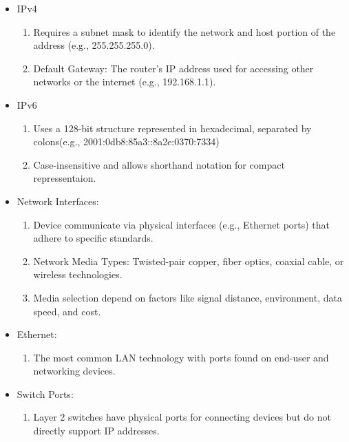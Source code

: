 \documentclass[a4paper,11pt]{article}
\begin{document}
\begin{itemize}
    \item IPv4
    \begin{enumerate}
        \item Requires a subnet mask to identify the network and host portion of the address (e.g., 255.255.255.0).\\
        \item Default Gateway: The router's IP address used for accessing other networks or the internet (e.g., 192.168.1.1).\\
    \end{enumerate}
    \item IPv6
    \begin{enumerate}
        \item Uses a 128-bit structure represented in hexadecimal, separated by colons(e.g., 2001:0db8:85a3::8a2e:0370:7334)\\
        \item Case-insensitive and allows shorthand notation for compact repressentaion.\\
    \end{enumerate}
    \item Network Interfaces:
    \begin{enumerate}
        \item Device communicate via physical interfaces (e.g., Ethernet ports) that adhere to specific standards.\\
        \item Network Media Types: Twisted-pair copper, fiber optics, coaxial cable, or wireless technologies.\\
        \item Media selection depend on factors like signal distance, environment, data speed, and cost.\\
    \end{enumerate}
    \item Ethernet:
    \begin{enumerate}
        \item The most common LAN technology with ports found on end-user and networking devices.\\
    \end{enumerate}
    \item Switch Ports:
    \begin{enumerate}
        \item Layer 2 switches have physical ports for connecting devices but do not directly support IP addresses.\\

\end{enumerate}
\end{itemize}
\end{document}
